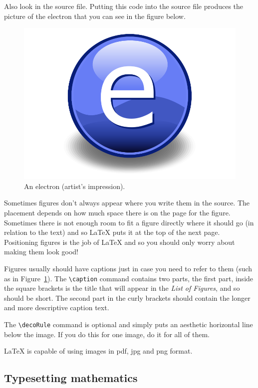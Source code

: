 Also look in the source file. Putting this code into the source file produces 
the picture of the electron that you can see in the figure below.

\begin{figure}[th]
\centering
\includegraphics{Figures/Electron}
\decoRule
\caption[An Electron]{An electron (artist's impression).}
\label{fig:Electron}
\end{figure}

Sometimes figures don't always appear where you write them in the source. The 
placement depends on how much space there is on the page for the figure. 
Sometimes there is not enough room to fit a figure directly where it should go 
(in relation to the text) and so \LaTeX{} puts it at the top of the next page. 
Positioning figures is the job of \LaTeX{} and so you should only worry about 
making them look good!

Figures usually should have captions just in case you need to refer to them 
(such as in Figure~\ref{fig:Electron}). The \verb|\caption| command contains 
two parts, the first part, inside the square brackets is the title that will 
appear in the \emph{List of Figures}, and so should be short. The second part 
in the curly brackets should contain the longer and more descriptive caption text.

The \verb|\decoRule| command is optional and simply puts an aesthetic horizontal 
line below the image. If you do this for one image, do it for all of them.

\LaTeX{} is capable of using images in pdf, jpg and png format.

\subsection{Typesetting mathematics}


